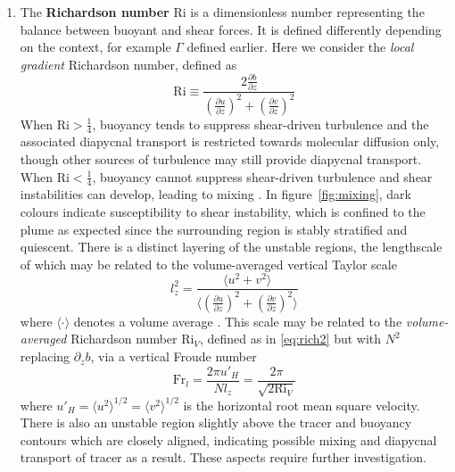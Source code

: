 \documentclass[a4paper]{article}
\begin{document}
\begin{enumerate}[label=(\alph*)]
	\item The \textbf{Richardson number} $\mathrm{Ri}$ is a dimensionless number representing the balance
		between buoyant and shear forces. It is defined differently depending on the context, for example
		$\Gamma$ defined earlier. Here we consider the \emph{local gradient} Richardson number, defined as
		\begin{equation}
			\mathrm{Ri} \equiv \frac{2\frac{\partial b}{\partial z}}{\left(\frac{\partial u}{\partial
			z}\right)^2 + \left(\frac{\partial v}{\partial z}\right)^2}
			\label{eq:rich2}
		\end{equation}
		When $\mathrm{Ri} > \frac{1}{4}$, buoyancy tends to suppress shear-driven turbulence and the
		associated diapycnal transport is restricted towards molecular diffusion only, though other sources of
		turbulence may still provide diapycnal transport. When $\mathrm{Ri} < \frac{1}{4}$, buoyancy cannot
		suppress shear-driven turbulence and shear instabilities can develop, leading to mixing
		\citep{ivey2008}. In figure~\ref{fig:mixing}, dark colours indicate susceptibility to shear
		instability, which is confined to the plume as expected since the surrounding region is stably
		stratified and quiescent. There is a distinct layering of the unstable regions, the lengthscale of
		which may be related to the volume-averaged vertical Taylor scale
		\begin{equation}
			l_z^2 = \frac{\langle u^2 + v^2 \rangle}{\langle \left(\frac{\partial u}{\partial z}\right)^2 +
		\left(\frac{\partial v}{\partial z}\right)^2 \rangle}
		\end{equation}
		where $\langle \cdot \rangle$ denotes a volume average \citep{riley2003}. This scale may be related to
		the \emph{volume-averaged} Richardson number $\mathrm{Ri}_V$, defined as in \eqref{eq:rich2} but with
		$N^2$ replacing $\partial_z b$, via a vertical Froude number
		\begin{equation}
			\mathrm{Fr}_l = \frac{2\pi u'_H}{N l_z} = \frac{2\pi}{\sqrt{2\mathrm{Ri}_V}}
		\end{equation}
		where $u'_H = \langle u^2 \rangle^{1/2} = \langle v^2 \rangle^{1/2}$ is the horizontal root mean
		square velocity. There is also an unstable region slightly above the tracer and buoyancy contours
		which are closely aligned, indicating possible mixing and diapycnal transport of tracer
		as a result. These aspects require further investigation.


\end{enumerate}
\end{document}
